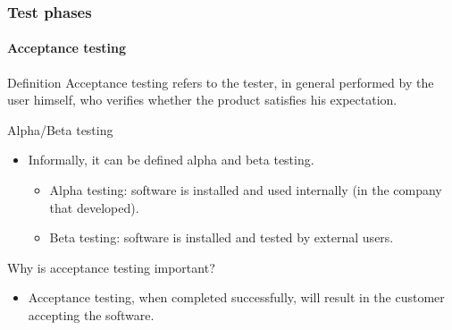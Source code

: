 \begin{frame}[hasprev=true, hasnext=false]
\label{concept:acceptance-testing}
\frametitle{Test phases}
\framesubtitle{Acceptance testing}

\begin{block:concept}{Definition}
Acceptance testing refers to the tester, in general performed by the
user himself, who verifies whether the product satisfies his expectation.
\end{block:concept}

\begin{block:fact}{Alpha/Beta testing}
\begin{itemize}
	\item Informally, it can be defined alpha and beta testing.
	\begin{itemize}
		\item Alpha testing: software is installed and used internally (in the
		company that developed).

		\item Beta testing: software is installed and tested by external
		users.
	\end{itemize}
\end{itemize}
\end{block:fact}

\begin{block:fact}{Why is acceptance testing important?}
\begin{itemize}
    \item Acceptance testing, when completed successfully, will result in the
    customer accepting the software.
\end{itemize}
\end{block:fact}
\end{frame}